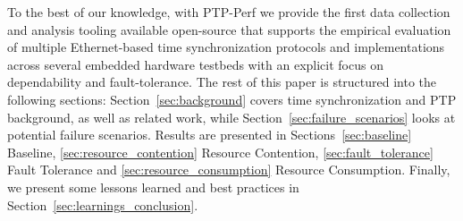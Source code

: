 To the best of our knowledge, with PTP-Perf we provide the first data collection and analysis tooling available open-source that supports the empirical evaluation of multiple Ethernet-based time synchronization protocols and implementations across several embedded hardware testbeds with an explicit focus on dependability and fault-tolerance.
%
The rest of this paper is structured into the following sections: Section~\ref{sec:background} covers time synchronization and PTP background, as well as related work, while Section~\ref{sec:failure_scenarios} looks at potential failure scenarios. Results are presented in Sections~\ref{sec:baseline} Baseline, \ref{sec:resource_contention} Resource Contention, \ref{sec:fault_tolerance} Fault Tolerance and \ref{sec:resource_consumption} Resource Consumption. Finally, we present some lessons learned and best practices in Section~\ref{sec:learnings_conclusion}.